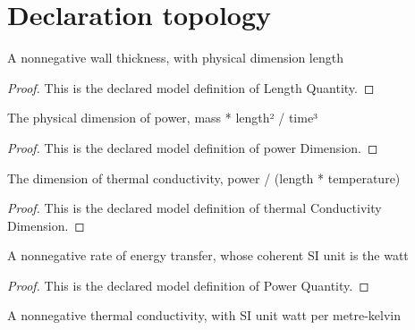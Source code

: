 \section{Declaration topology}
\begin{definition}
  \label{def:physics:phyx-mini-0466:phyxminiproblems-problemphyxmini0466-lengthquantity}
  A nonnegative wall thickness, with physical dimension length
\end{definition}
\begin{proof}
  This is the declared model definition of Length Quantity.
\end{proof}
\begin{definition}
  \label{def:physics:phyx-mini-0466:phyxminiproblems-problemphyxmini0466-powerdimension}
  The physical dimension of power, mass * length² / time³
\end{definition}
\begin{proof}
  This is the declared model definition of power Dimension.
\end{proof}
\begin{definition}
  \label{def:physics:phyx-mini-0466:phyxminiproblems-problemphyxmini0466-thermalconductivitydimension}
  The dimension of thermal conductivity, power / (length * temperature)
\end{definition}
\begin{proof}
  This is the declared model definition of thermal Conductivity Dimension.
\end{proof}
\begin{definition}
  \label{def:physics:phyx-mini-0466:phyxminiproblems-problemphyxmini0466-powerquantity}
  A nonnegative rate of energy transfer, whose coherent SI unit is the watt
\end{definition}
\begin{proof}
  This is the declared model definition of Power Quantity.
\end{proof}
\begin{definition}
  \label{def:physics:phyx-mini-0466:phyxminiproblems-problemphyxmini0466-thermalconductivityquantity}
  A nonnegative thermal conductivity, with SI unit watt per metre-kelvin
\end{definition}

